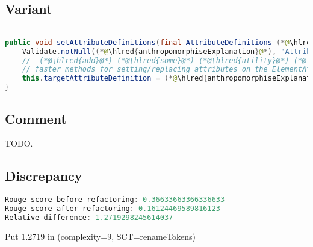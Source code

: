 \documentclass[11pt]{article}
\DeclareRobustCommand{\hlred}[1]{{\sethlcolor{YellowOrange}\hl{#1}}}
\begin{document}
  \subsection{Variant}

  \begin{lstlisting}[language=java]

public void setAttributeDefinitions(final AttributeDefinitions (*@\hlred{anthropomorphiseExplanation}@*)) {
    Validate.notNull((*@\hlred{anthropomorphiseExplanation}@*), "Attribute Definitions cannot be null");
    //  (*@\hlred{add}@*) (*@\hlred{some}@*) (*@\hlred{utility}@*) (*@\hlred{code}@*) (*@\hlred{or}@*) (*@\hlred{use}@*) (*@\hlred{these}@*) (*@\hlred{two}@*) (*@\hlred{and}@*) (*@\hlred{three}@*) to (*@\hlred{use}@*) (*@\hlred{generic}@*) (*@\hlred{types }@*)to (*@\hlred{allow}@*)
    // faster methods for setting/replacing attributes on the ElementAttributes implementation
    this.targetAttributeDefinition = (*@\hlred{anthropomorphiseExplanation}@*).forName(TEMPLATE_MODE, this.targetAttributeCompleteName);
}
  \end{lstlisting}

  \subsection{Comment}

  TODO.

  \subsection{Discrepancy}

  \begin{lstlisting}[language=java]
Rouge score before refactoring: 0.36633663366336633
Rouge score after refactoring: 0.16124469589816123
Relative difference: 1.2719298245614037
  \end{lstlisting}

  Put 1.2719 in (complexity=9, SCT=renameTokens)
\end{document}
